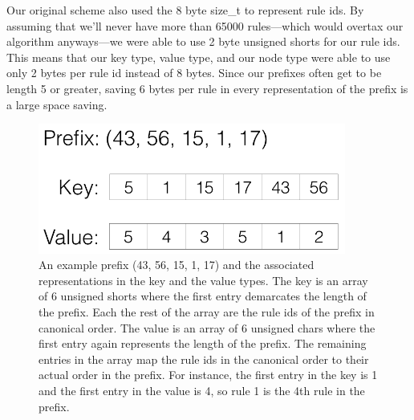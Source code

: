 Our original scheme also used the 8 byte size\_t to represent rule ids.
By assuming that we'll never have more than 65000 rules---which would overtax our algorithm anyways---we were able to use 2 byte unsigned shorts for our rule ids.
This means that our key type, value type, and our node type were able to use only 2 bytes per rule id instead of 8 bytes.
Since our prefixes often get to be length 5 or greater, saving 6 bytes per rule in every representation of the prefix is a large space saving.

\begin{figure}[t!]
\begin{center}
\includegraphics[width=0.9\textwidth]{figs/pmap_types.png}
\end{center}
\caption{An example prefix (43, 56, 15, 1, 17) and the associated representations in the key and the value types.
The key is an array of 6 unsigned shorts where the first entry demarcates the length of the prefix.
Each the rest of the array are the rule ids of the prefix in canonical order.
The value is an array of 6 unsigned chars where the first entry again represents the length of the prefix.
The remaining entries in the array map the rule ids in the canonical order to their actual order in the prefix.
For instance, the first entry in the key is 1 and the first entry in the value is 4, so rule 1 is the 4th rule in the prefix.}
\label{fig:pmap-types}
\end{figure}

